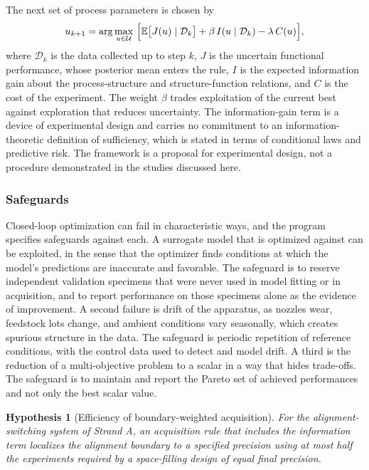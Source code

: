 \documentclass[11pt]{article}
\newtheorem{hypothesis}{Hypothesis}
\theoremstyle{definition}
\newcommand{\E}{\mathbb{E}}
\begin{document}
The next set of process parameters is chosen by
\begin{equation}
u_{k+1}=\arg\max_{u\in\mathcal{U}}\ \Bigl[\E\bigl[J(u)\mid\mathcal{D}_k\bigr]+\beta\,I(u\mid\mathcal{D}_k)-\lambda\,C(u)\Bigr],
\end{equation}
where $\mathcal{D}_k$ is the data collected up to step $k$, $J$ is the uncertain functional performance, whose posterior mean enters the rule, $I$ is the expected information gain about the process-structure and structure-function relations, and $C$ is the cost of the experiment. The weight $\beta$ trades exploitation of the current best against exploration that reduces uncertainty. The information-gain term is a device of experimental design and carries no commitment to an information-theoretic definition of sufficiency, which is stated in terms of conditional laws and predictive risk. The framework is a proposal for experimental design, not a procedure demonstrated in the studies discussed here.

\subsubsection*{Safeguards}

Closed-loop optimization can fail in characteristic ways, and the program specifies safeguards against each. A surrogate model that is optimized against can be exploited, in the sense that the optimizer finds conditions at which the model's predictions are inaccurate and favorable. The safeguard is to reserve independent validation specimens that were never used in model fitting or in acquisition, and to report performance on those specimens alone as the evidence of improvement. A second failure is drift of the apparatus, as nozzles wear, feedstock lots change, and ambient conditions vary seasonally, which creates spurious structure in the data. The safeguard is periodic repetition of reference conditions, with the control data used to detect and model drift. A third is the reduction of a multi-objective problem to a scalar in a way that hides trade-offs. The safeguard is to maintain and report the Pareto set of achieved performances and not only the best scalar value.

\begin{hypothesis}[Efficiency of boundary-weighted acquisition]
\label{hyp:acq}
For the alignment-switching system of Strand A, an acquisition rule that includes the information term localizes the alignment boundary to a specified precision using at most half the experiments required by a space-filling design of equal final precision.
\end{hypothesis}
\end{document}
